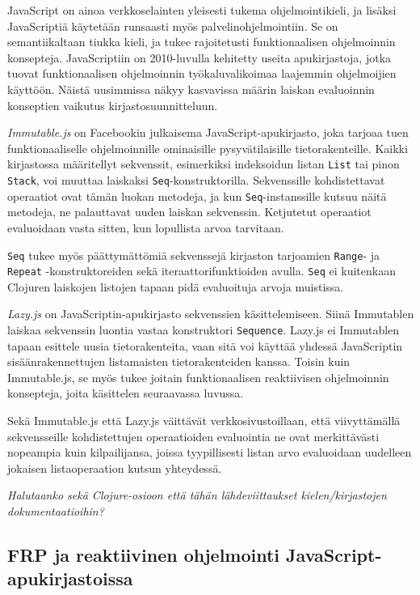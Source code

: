 JavaScript on ainoa verkkoselainten yleisesti tukema ohjelmointikieli, ja lisäksi JavaScriptiä käytetään runsaasti myös palvelinohjelmointiin. Se on semantiikaltaan tiukka kieli, ja tukee rajoitetusti funktionaalisen ohjelmoinnin konsepteja.  JavaScriptiin on 2010-luvulla kehitetty useita apukirjastoja, jotka tuovat funktionaalisen ohjelmoinnin työkaluvalikoimaa laajemmin ohjelmoijien käyttöön. Näistä uusimmissa näkyy kasvavissa määrin laiskan evaluoinnin konseptien vaikutus kirjastosuunnitteluun.

\textit{Immutable.js} on Facebookin julkaisema JavaScript-apukirjasto, joka tarjoaa tuen funktionaaliselle ohjelmoinnille ominaisille pysyvätilaisille tietorakenteille. Kaikki kirjastossa määritellyt sekvenssit, esimerkiksi indeksoidun listan \verb!List! tai pinon \verb!Stack!, voi muuttaa laiskaksi \verb!Seq!-konstruktorilla. Sekvenssille kohdistettavat operaatiot ovat tämän luokan metodeja, ja kun \verb!Seq!-instanssille kutsuu näitä metodeja, ne palauttavat uuden laiskan sekvenssin. Ketjutetut operaatiot evaluoidaan vasta sitten, kun lopullista arvoa tarvitaan.

\begin{sloppypar}
\verb!Seq! tukee myös päättymättömiä sekvenssejä kirjaston tarjoamien \verb!Range!- ja \verb!Repeat! \mbox{-konstruktoreiden} sekä iteraattorifunktioiden avulla. \verb!Seq! ei kuitenkaan Clojuren laiskojen listojen tapaan pidä evaluoituja arvoja muistissa.
\end{sloppypar}

\textit{Lazy.js} on JavaScriptin-apukirjasto sekvenssien käsittelemiseen. Siinä Immutablen laiskaa sekvenssin luontia vastaa konstruktori \verb!Sequence!. Lazy.js ei Immutablen tapaan esittele uusia tietorakenteita, vaan sitä voi käyttää yhdessä JavaScriptin sisäänrakennettujen listamaisten tietorakenteiden kanssa. Toisin kuin Immutable.js, se myös tukee joitain funktionaalisen reaktiivisen ohjelmoinnin konsepteja, joita käsittelen seuraavassa luvussa.

Sekä Immutable.js että Lazy.js väittävät verkkosivustoillaan, että viivyttämällä sekvensseille kohdistettujen operaatioiden evaluointia ne ovat merkittävästi nopeampia kuin kilpailijansa, joissa tyypillisesti listan arvo evaluoidaan uudelleen jokaisen listaoperaation kutsun yhteydessä.

\textit{Halutaanko sekä Clojure-osioon että tähän lähdeviittaukset kielen/kirjastojen dokumentaatioihin?}

\subsection{FRP ja reaktiivinen ohjelmointi JavaScript-apukirjastoissa}

